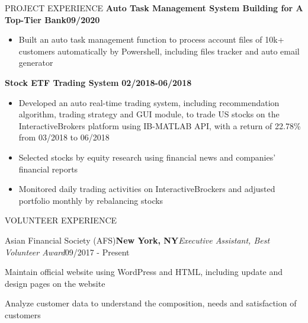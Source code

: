 \documentclass{resume} %
\begin{document}
\begin{rSection}{PROJECT EXPERIENCE}
{\bf Auto Task Management System Building for A Top-Tier Bank}\hfill {\bf 09/2020}
\renewcommand\labelitemi{\textperiodcentered}

\begin{itemize}[leftmargin=0.15cm]
\setlength\itemsep{-0.5em}
  \item Built an auto task management function to process account files of 10k+ customers automatically by Powershell, including files tracker and auto email generator
\end{itemize}


{\bf Stock ETF Trading System} \hfill {\bf 02/2018-06/2018}
\renewcommand\labelitemi{\textperiodcentered}


	\begin{itemize}[leftmargin=0.15cm]
	\setlength\itemsep{-0.5em}
	\item Developed an auto real-time trading system, including recommendation algorithm, trading strategy and GUI module, to trade US stocks on the InteractiveBrokers platform using IB-MATLAB API, with a return of 22.78\% from 03/2018 to 06/2018
	\item Selected stocks by equity research using financial news and companies’ financial reports
	\item Monitored daily trading activities on InteractiveBrockers and adjusted portfolio monthly by rebalancing stocks
\end{itemize}

\end{rSection}

\begin{rSection}{VOLUNTEER EXPERIENCE}
\begin{rSubsection}{Asian Financial Society (AFS)}{\bf New York, NY}{\textit{Executive Assistant, Best Volunteer Award}}{09/2017 - Present}
	\item Maintain official website using WordPress and HTML, including update and design pages on the website
	\item Analyze customer data to understand the composition, needs and satisfaction of customers
\end{rSubsection}

\end{rSection}
\end{document}
